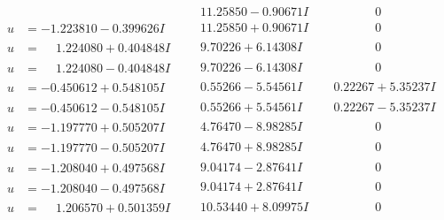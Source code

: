 \documentclass[1p]{elsarticle_modified}
\theoremstyle{definition}
\begin{document}
$$\begin{array}{c|c|c}
 & \phantom{-}11.25850 - 0.90671 I & \phantom{-0.000000 } 0 \\ \hline\begin{aligned}
u &= -1.223810 - 0.399626 I\end{aligned}
 & \phantom{-}11.25850 + 0.90671 I & \phantom{-0.000000 } 0 \\ \hline\begin{aligned}
u &= \phantom{-}1.224080 + 0.404848 I\end{aligned}
 & \phantom{-}9.70226 + 6.14308 I & \phantom{-0.000000 } 0 \\ \hline\begin{aligned}
u &= \phantom{-}1.224080 - 0.404848 I\end{aligned}
 & \phantom{-}9.70226 - 6.14308 I & \phantom{-0.000000 } 0 \\ \hline\begin{aligned}
u &= -0.450612 + 0.548105 I\end{aligned}
 & \phantom{-}0.55266 - 5.54561 I & \phantom{-}0.22267 + 5.35237 I \\ \hline\begin{aligned}
u &= -0.450612 - 0.548105 I\end{aligned}
 & \phantom{-}0.55266 + 5.54561 I & \phantom{-}0.22267 - 5.35237 I \\ \hline\begin{aligned}
u &= -1.197770 + 0.505207 I\end{aligned}
 & \phantom{-}4.76470 - 8.98285 I & \phantom{-0.000000 } 0 \\ \hline\begin{aligned}
u &= -1.197770 - 0.505207 I\end{aligned}
 & \phantom{-}4.76470 + 8.98285 I & \phantom{-0.000000 } 0 \\ \hline\begin{aligned}
u &= -1.208040 + 0.497568 I\end{aligned}
 & \phantom{-}9.04174 - 2.87641 I & \phantom{-0.000000 } 0 \\ \hline\begin{aligned}
u &= -1.208040 - 0.497568 I\end{aligned}
 & \phantom{-}9.04174 + 2.87641 I & \phantom{-0.000000 } 0 \\ \hline\begin{aligned}
u &= \phantom{-}1.206570 + 0.501359 I\end{aligned}
 & \phantom{-}10.53440 + 8.09975 I & \phantom{-0.000000 } 0 \\ \hline\begin{aligned}

\end{aligned}
\end{array}$$
\end{document}
